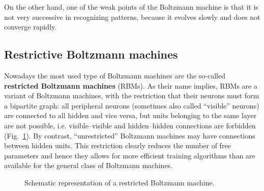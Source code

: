 On the other hand, one of the weak points of the Boltzmann machine is that it is not very successive in recognizing patterns, because it evolves slowly and does not converge rapidly.
\subsection{Restrictive Boltzmann machines}
Nowadays the most used type of Boltzmann machines are the so-called \textbf{restricted Boltzmann machines} (RBMs). As their name implies, RBMs are a variant of Boltzmann machines, with the restriction that their neurons must form a bipartite graph: all peripheral neurons (sometimes also called ``visible'' neurons) are connected to all hidden and vice versa, but units belonging to the same layer are not possible, i.e. visible--visible and hidden--hidden connections are forbidden (Fig.~\ref{RBM}). By contrast, ``unrestricted'' Boltzmann machines may have connections between hidden units. This restriction clearly reduces the number of free parameters and hence they allows for more efficient training algorithms than are available for the general class of Boltzmann machines.
\begin{figure}[h!t]
\centering
\newcommand{\coupling}{black!50}
\caption{Schematic representation of a restricted Boltzmann machine.}\label{RBM}
\end{figure}

